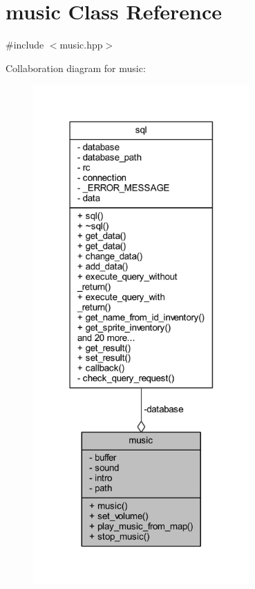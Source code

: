 \hypertarget{classmusic}{}\section{music Class Reference}
\label{classmusic}


{\ttfamily \#include $<$music.\+hpp$>$}



Collaboration diagram for music\+:
\nopagebreak
\begin{figure}[H]
\begin{center}
\leavevmode
\includegraphics[width=235pt]{classmusic__coll__graph}
\end{center}
\end{figure}
